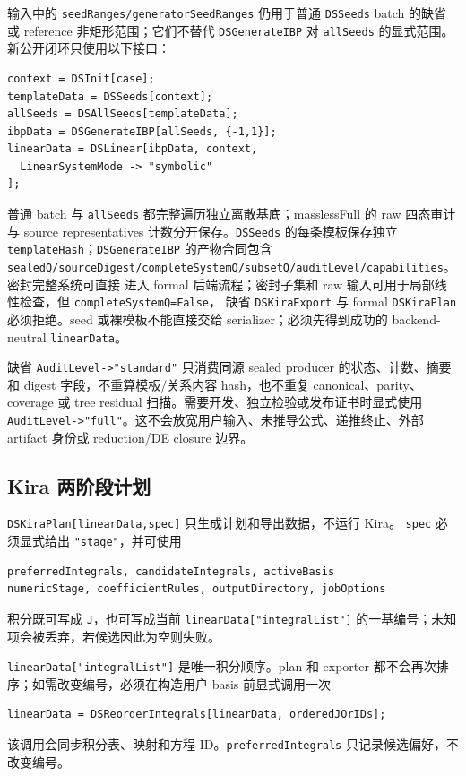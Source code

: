﻿\documentclass[a4paper,11pt]{article}
\begin{document}
输入中的 \texttt{seedRanges/generatorSeedRanges} 仍用于普通 \texttt{DSSeeds} batch 的缺省或
reference 非矩形范围；它们不替代 \texttt{DSGenerateIBP} 对 \texttt{allSeeds} 的显式范围。
新公开闭环只使用以下接口：
\begin{verbatim}
context = DSInit[case];
templateData = DSSeeds[context];
allSeeds = DSAllSeeds[templateData];
ibpData = DSGenerateIBP[allSeeds, {-1,1}];
linearData = DSLinear[ibpData, context,
  LinearSystemMode -> "symbolic"
];
\end{verbatim}
普通 batch 与 \texttt{allSeeds} 都完整遍历独立离散基底；masslessFull 的 raw 四态审计与 source representatives 计数分开保存。\texttt{DSSeeds} 的每条模板保存独立
\texttt{templateHash}；\texttt{DSGenerateIBP} 的产物合同包含
\texttt{sealedQ/sourceDigest/completeSystemQ/subsetQ/auditLevel/capabilities}。密封完整系统可直接
进入 formal 后端流程；密封子集和 raw 输入可用于局部线性检查，但 \texttt{completeSystemQ=False}，
缺省 \texttt{DSKiraExport} 与 formal \texttt{DSKiraPlan} 必须拒绝。seed 或裸模板不能直接交给
serializer；必须先得到成功的 backend-neutral \texttt{linearData}。

缺省 \texttt{AuditLevel->"standard"} 只消费同源 sealed producer 的状态、计数、摘要和 digest 字段，不重算模板/关系内容 hash，也不重复 canonical、parity、coverage 或 tree residual 扫描。需要开发、独立检验或发布证书时显式使用 \texttt{AuditLevel->"full"}。这不会放宽用户输入、未推导公式、递推终止、外部 artifact 身份或 reduction/DE closure 边界。

\subsection{Kira 两阶段计划}

\texttt{DSKiraPlan[linearData,spec]} 只生成计划和导出数据，不运行 Kira。
\texttt{spec} 必须显式给出 \texttt{"stage"}，并可使用
\begin{verbatim}
preferredIntegrals, candidateIntegrals, activeBasis
numericStage, coefficientRules, outputDirectory, jobOptions
\end{verbatim}
积分既可写成 \texttt{J}，也可写成当前
\texttt{linearData["integralList"]} 的一基编号；未知项会被丢弃，若候选因此为空则失败。

\texttt{linearData["integralList"]} 是唯一积分顺序。plan 和 exporter 都不会再次排序；如需改变编号，必须在构造用户 basis 前显式调用一次
\begin{verbatim}
linearData = DSReorderIntegrals[linearData, orderedJOrIDs];
\end{verbatim}
该调用会同步积分表、映射和方程 ID。\texttt{preferredIntegrals} 只记录候选偏好，不改变编号。
\end{document}
